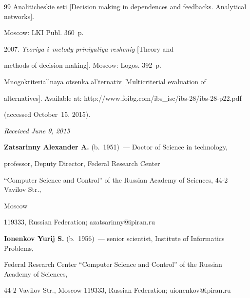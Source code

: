 {{\begin{thebibliography}{99}
{Ana\-li\-ti\-cheskie seti} [Decision making in dependences and feedbacks. Analytical networks]. 

Moscow: LKI Publ. 360~p.


 2007. \textit{Teoriya i~metody priniyatiya resheniy} [Theory and 

methods of decision making]. Moscow: Logos. 392~p.


 Mnogokriterial'naya otsenka al'ternativ [Multicriterial evaluation of 

alternatives]. Available at: {\sf http://www.foibg.com/ibs\_isc/ibs-28/ibs-28-p22.pdf}

(accessed October~15, 2015).

   \end{thebibliography}

} }





\vspace*{-1pt}



\hfill{\small\textit{Received June 9, 2015}}   

      

      

      \Contr

      

      \noindent

      \textbf{Zatsarinny Alexander A.} (b.\ 1951)~--- Doctor of Science in technology, 

professor, Deputy Director, Federal Research Center 

``Computer Science and Control'' of the Russian Academy of Sciences, 44-2 Vavilov Str., 

Moscow 

119333, Russian Federation; azatsarinny@ipiran.ru

      

      \vspace*{3pt}



\noindent

\textbf{Ionenkov Yurij S.} (b.\ 1956)~--- senior scientist, Institute of Informatics Problems, 

Federal Research Center ``Computer Science and Control'' of the Russian Academy of Sciences, 

44-2 Vavilov Str., Moscow 119333, Russian Federation; uionenkov@ipiran.ru



 \label{end\stat}





\renewcommand{\bibname}{\protect\rm Литература} 

     

